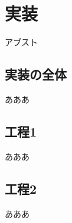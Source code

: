 \chapter{実装}
\label{chap:implementation}

アブスト

\section{実装の全体}

あああ

\section{工程1}

あああ

\section{工程2}

あああ
